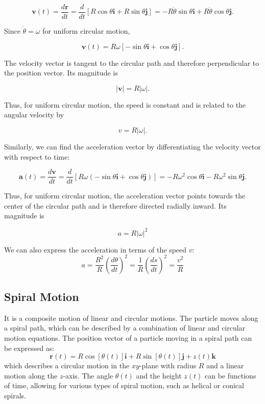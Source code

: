 \documentclass[12pt]{article}
\theoremstyle{remark}
\begin{document}
\begin{equation}
\mathbf{v}(t) = \frac{d\mathbf{r}}{dt}
=
\frac{d}{dt}
\left[
R\cos\theta\mathbf{i}
+
R\sin\theta\mathbf{j}
\right]
=
-R\dot{\theta}\sin\theta\mathbf{i}
+
R\dot{\theta}\cos\theta\mathbf{j}.
\end{equation}

Since $\dot{\theta}=\omega$ for uniform circular motion,

\begin{equation}
\mathbf{v}(t)
=
R\omega
\left[
-\sin\theta\mathbf{i}
+
\cos\theta\mathbf{j}
\right].
\end{equation}

The velocity vector is tangent to the circular path and therefore perpendicular to the position vector. Its magnitude is

$$
|\mathbf{v}|=R|\omega|.
$$

Thus, for uniform circular motion, the speed is constant and is related to the angular velocity by

$$
v=R|\omega|.
$$

Similarly, we can find the acceleration vector by differentiating the velocity vector with respect to time:

\begin{equation}
\mathbf{a}(t) = \frac{d\mathbf{v}}{dt}
=
\frac{d}{dt}
\left[
R\omega
\left(
-\sin\theta\mathbf{i}
+
\cos\theta\mathbf{j}
\right)
\right]
=
-R\omega^2\cos\theta\mathbf{i}
-
R\omega^2\sin\theta\mathbf{j}.
\end{equation}

Thus, for uniform circular motion, the acceleration vector points towards the center of the circular path and is therefore directed radially inward. Its magnitude is

\begin{equation}
a=R|\omega|^2 
\end{equation}

We can also express the acceleration in terms of the speed $v$:
\begin{equation}
a  = \frac{R^2}{R} \left(\frac{d\theta}{dt}\right)^2 = \frac{1}{R} \left(\frac{ds}{dt}\right)^2 = \frac{v^2}{R}
\end{equation}


\subsection{Spiral Motion}

It is a composite motion of linear and circular motions. The particle moves along a spiral path, which can be described by a combination of linear and circular motion equations. The position vector of a particle moving in a spiral path can be expressed as:
\[
\mathbf{r}(t) = R \cos[\theta(t)] \mathbf{i} + R \sin[\theta(t)] \mathbf{j} + z(t) \mathbf{k}
\]
which describes a circular motion in the \(xy\)-plane with radius \(R\) and a linear motion along the \(z\)-axis. The angle \(\theta(t)\) and the height \(z(t)\) can be functions of time, allowing for various types of spiral motion, such as helical or conical spirals.
\end{document}
